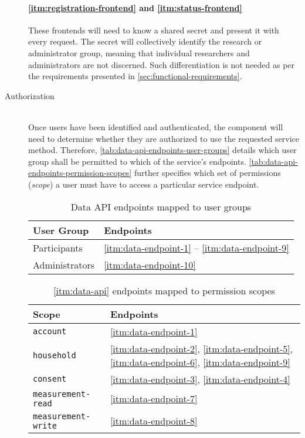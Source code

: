 \begin{description}
  \paragraph{\ref{itm:registration-frontend} and \ref{itm:status-frontend}}
  These frontends will need to know a shared secret and present it with every request. The secret will collectively identify the research or administrator group, meaning that individual researchers and administrators are not discerned. Such differentiation is not needed as per the requirements presented in \autoref{sec:functional-requirements}.

  \item[Authorization\label{itm:data-api-authorization}]
  \hfill \\
  Once users have been identified and authenticated, the component will need to determine whether they are authorized to use the requested service method. Therefore, \autoref{tab:data-api-endpoints-user-groups} details which user group shall be permitted to which of the service's endpoints. \autoref{tab:data-api-endpoints-permission-scopes} further specifies which set of permissions (\textit{scope}) a user must have to access a particular service endpoint.

\begin{table}[hbt]
	\centering
  	\begin{tabularx}{\textwidth}{|l|X|}
		\hline
		\textbf{User Group} & \textbf{Endpoints} \\
	    \hline
	    Participants & \ref{itm:data-endpoint-1} -- \ref{itm:data-endpoint-9} \\
		Administrators & \ref{itm:data-endpoint-10} \\
	    	\hline
	\end{tabularx}
  	\caption{Data \acs{API} endpoints mapped to user groups}
  	\label{tab:data-api-endpoints-user-groups}
\end{table}

\FloatBarrier

\begin{table}[hbt]
	\centering
  	\begin{tabularx}{\textwidth}{|l|X|}
		\hline
		\textbf{Scope} & \textbf{Endpoints} \\
	    \hline
	    \texttt{account} & \ref{itm:data-endpoint-1} \\
		\texttt{household} & \ref{itm:data-endpoint-2}, \ref{itm:data-endpoint-5}, \ref{itm:data-endpoint-6}, \ref{itm:data-endpoint-9} \\
		\texttt{consent} & \ref{itm:data-endpoint-3}, \ref{itm:data-endpoint-4} \\
		\texttt{measurement-read} & \ref{itm:data-endpoint-7} \\
		\texttt{measurement-write} & \ref{itm:data-endpoint-8} \\
	    	\hline
	\end{tabularx}
  	\caption{\ref{itm:data-api} endpoints mapped to permission scopes}
  	\label{tab:data-api-endpoints-permission-scopes}
\end{table}


\end{description}
